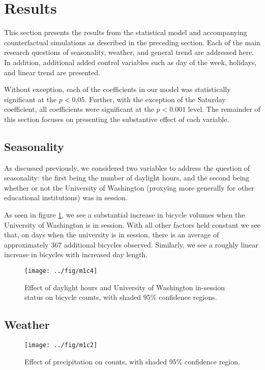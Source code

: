 \documentclass[12pt,letterpaper,article,twocolumn]{memoir}
\begin{document}
\section*{Results}
% 
% 
This section presents the results from the statistical model and
accompanying counterfactual simulations as described in the preceding
section. Each of the main research questions of seasonality, weather,
and general trend are addressed here. In addition, additional added
control variables such as day of the week, holidays, and linear trend
are presented.

Without exception, each of the coefficients in our model was
statistically significant at the $p < 0.05$. Further, with the
exception of the Saturday coefficient, all coefficients were
significant at the $p < 0.001$ level. The remainder of this section
focuses on presenting the substantive effect of each variable.

\subsection*{Seasonality}
As discussed previously, we considered two variables to address the
question of seasonality: the first being the number of daylight hours,
and the second being whether or not the University of Washington
(proxying more generally for other educational institutions) was in
session.

As seen in figure \ref{fg:seasonality}, we see a substantial increase
in bicycle volumes when the University of Washington is in session.
With all other factors held constant we see that, on days when the
university is in session, there is an average of approximately 367
additional bicycles observed. Similarly, we see a roughly linear
increase in bicycles with increased day length.

\begin{figure}[h!]
  \centering
  \texttt{[image: ../fig/m1c4]}
  \caption{Effect of daylight hours and University of Washington
    in-session status on bicycle counts, with shaded 95\% confidence
    regions.}
  \label{fg:seasonality}
\end{figure}


\subsection*{Weather}

\begin{figure}[h!]
  \centering
  \texttt{[image: ../fig/m1c2]}
  \caption{Effect of precipitation on counts, with shaded 95\%
    confidence region.}
  \label{fg:precipitation}
\end{figure}
\end{document}
